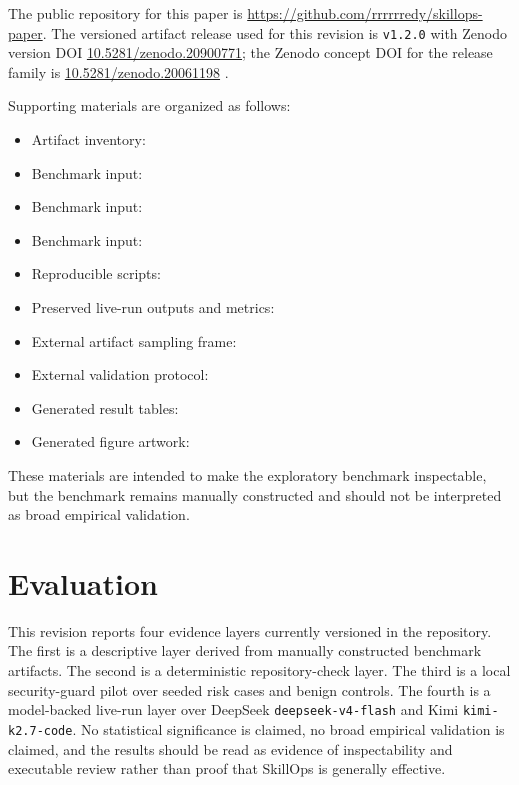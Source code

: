 \documentclass[11pt]{article}
\begin{document}
The public repository for this paper is
\url{https://github.com/rrrrrredy/skillops-paper}. The versioned artifact
release used for this revision is \texttt{v1.2.0} with Zenodo version DOI
\href{https://doi.org/10.5281/zenodo.20900771}{10.5281/zenodo.20900771};
the Zenodo concept DOI for the release family is
\href{https://doi.org/10.5281/zenodo.20061198}{10.5281/zenodo.20061198}
\citep{luo2026skillopsartifact}.

Supporting materials are organized as follows:
\begin{itemize}[leftmargin=*]
    \item Artifact inventory: 
    \item Benchmark input: 
    \item Benchmark input: 
    \item Benchmark input: 
    \item Reproducible scripts: 
    \item Preserved live-run outputs and metrics: 
    \item External artifact sampling frame:
    \item External validation protocol:
    \item Generated result tables: 
    \item Generated figure artwork: 
\end{itemize}

These materials are intended to make the exploratory benchmark inspectable,
but the benchmark remains manually constructed and should not be interpreted as
broad empirical validation.

\section{Evaluation}
\label{sec:evaluation}

This revision reports four evidence layers currently versioned in the
repository. The first is a descriptive layer derived from manually constructed
benchmark artifacts. The second is a deterministic repository-check layer. The
third is a local security-guard pilot over seeded risk cases and benign
controls. The fourth is a model-backed live-run layer over DeepSeek
\texttt{deepseek-v4-flash} and Kimi \texttt{kimi-k2.7-code}. No statistical
significance is claimed, no broad empirical validation is claimed, and the
results should be read as evidence of inspectability and executable review
rather than proof that SkillOps is generally effective.
\end{document}
